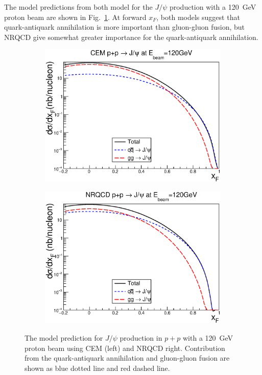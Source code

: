 \documentclass[10pt,a4paper,final]{article}
\begin{document}
The model predictions from both model for the $J/\psi$ production with a \SI{120}{\GeV}
proton beam are shown in Fig.~\ref{fig:jpsi_theory}. At forward $x_F$, both models suggest
that quark-antiquark annihilation is more important than gluon-gluon fusion, but NRQCD
give somewhat greater importance for the quark-antiquark annihilation.
\begin{figure}[htbp!]
	\centering
	\begin{subfigure}{0.45\linewidth}
		\includegraphics[width=0.9\linewidth]{pp_norm_cs_NLO_pp}
	\end{subfigure}
	\begin{subfigure}{0.45\linewidth}
		\includegraphics[width=0.9\linewidth]{jpsi_cs_pp}
	\end{subfigure}
	\caption{The model prediction for $J/\psi$ production in $p+p$ with a \SI{120}{\GeV}
		proton beam using CEM (left) and NRQCD {right}. Contribution from the
		quark-antiquark annihilation and gluon-gluon fusion are shown as blue dotted line
		and red dashed line.}
	\label{fig:jpsi_theory}
\end{figure}
\end{document}
